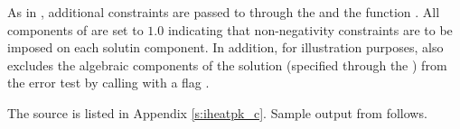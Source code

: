 As in , additional constraints are passed to {\ida} through
the   and the function .
All components of  are set to $1.0$ indicating that non-negativity
constraints are to be imposed on each solutin component.
In addition, for illustration purposes,  also excludes the algebraic 
components of the solution (specified through the  ) from the 
error test by calling  with a flag .

The source is listed in Appendix \ref{s:iheatpk_c}.
Sample output from  follows.


